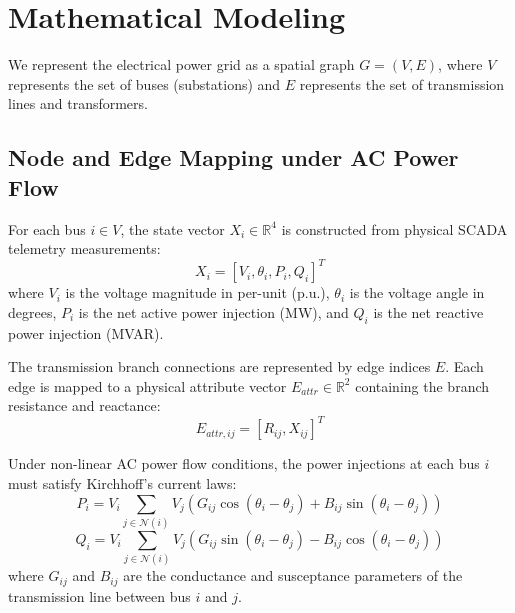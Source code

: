\documentclass[12pt,a4paper]{report}
\begin{document}
\chapter{Mathematical Modeling}
We represent the electrical power grid as a spatial graph $G = (V, E)$, where $V$ represents the set of buses (substations) and $E$ represents the set of transmission lines and transformers.

\section{Node and Edge Mapping under AC Power Flow}
For each bus $i \in V$, the state vector $X_i \in \mathbb{R}^4$ is constructed from physical SCADA telemetry measurements:
\begin{equation}
X_i = [V_i, \theta_i, P_i, Q_i]^T
\end{equation}
where $V_i$ is the voltage magnitude in per-unit (p.u.), $\theta_i$ is the voltage angle in degrees, $P_i$ is the net active power injection (MW), and $Q_i$ is the net reactive power injection (MVAR). 

The transmission branch connections are represented by edge indices $E$. Each edge is mapped to a physical attribute vector $E_{attr} \in \mathbb{R}^2$ containing the branch resistance and reactance:
\begin{equation}
E_{attr, ij} = [R_{ij}, X_{ij}]^T
\end{equation}

Under non-linear AC power flow conditions, the power injections at each bus $i$ must satisfy Kirchhoff's current laws:
\begin{equation}
P_i = V_i \sum_{j \in \mathcal{N}(i)} V_j \left( G_{ij} \cos(\theta_i - \theta_j) + B_{ij} \sin(\theta_i - \theta_j) \right)
\end{equation}
\begin{equation}
Q_i = V_i \sum_{j \in \mathcal{N}(i)} V_j \left( G_{ij} \sin(\theta_i - \theta_j) - B_{ij} \cos(\theta_i - \theta_j) \right)
\end{equation}
where $G_{ij}$ and $B_{ij}$ are the conductance and susceptance parameters of the transmission line between bus $i$ and $j$.
\end{document}
